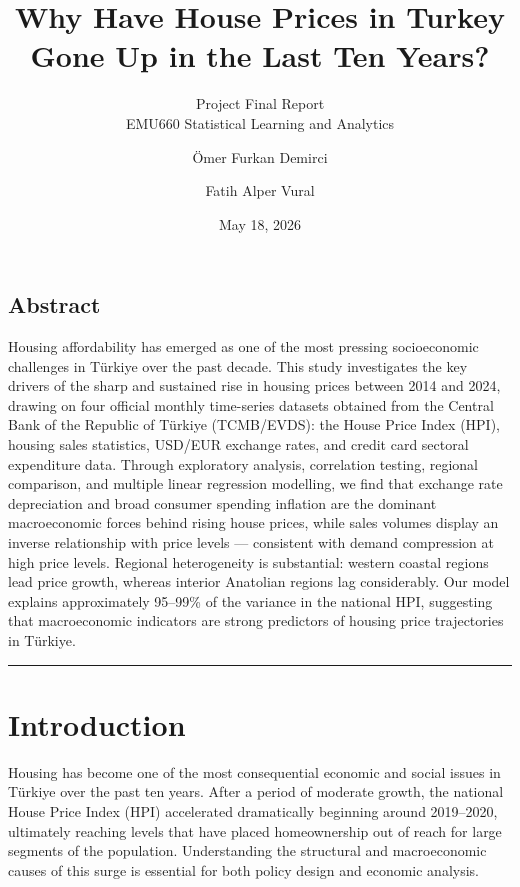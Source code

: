 \documentclass[
  11pt,
  a4paper,
]{article}
\title{Why Have House Prices in Turkey Gone Up in the Last Ten Years?}
\subtitle{Project Final Report\\
EMU660 Statistical Learning and Analytics}
\author{Ömer Furkan Demirci \and Fatih Alper Vural}
\date{May 18, 2026}
\renewcommand*\contentsname{Table of contents}
\newcommand\contentsname{Table of contents}
\begin{document}
\maketitle

\renewcommand*\contentsname{Table of contents}
{
\setcounter{tocdepth}{3}
\tableofcontents
}

\newpage

\subsection*{Abstract}\label{abstract}

Housing affordability has emerged as one of the most pressing
socioeconomic challenges in Türkiye over the past decade. This study
investigates the key drivers of the sharp and sustained rise in housing
prices between 2014 and 2024, drawing on four official monthly
time-series datasets obtained from the Central Bank of the Republic of
Türkiye (TCMB/EVDS): the House Price Index (HPI), housing sales
statistics, USD/EUR exchange rates, and credit card sectoral expenditure
data. Through exploratory analysis, correlation testing, regional
comparison, and multiple linear regression modelling, we find that
exchange rate depreciation and broad consumer spending inflation are the
dominant macroeconomic forces behind rising house prices, while sales
volumes display an inverse relationship with price levels --- consistent
with demand compression at high price levels. Regional heterogeneity is
substantial: western coastal regions lead price growth, whereas interior
Anatolian regions lag considerably. Our model explains approximately
95--99\% of the variance in the national HPI, suggesting that
macroeconomic indicators are strong predictors of housing price
trajectories in Türkiye.

\begin{center}\rule{0.5\linewidth}{0.5pt}\end{center}

\newpage

\section{Introduction}\label{introduction}

Housing has become one of the most consequential economic and social
issues in Türkiye over the past ten years. After a period of moderate
growth, the national House Price Index (HPI) accelerated dramatically
beginning around 2019--2020, ultimately reaching levels that have placed
homeownership out of reach for large segments of the population.
Understanding the structural and macroeconomic causes of this surge is
essential for both policy design and economic analysis.
\end{document}
